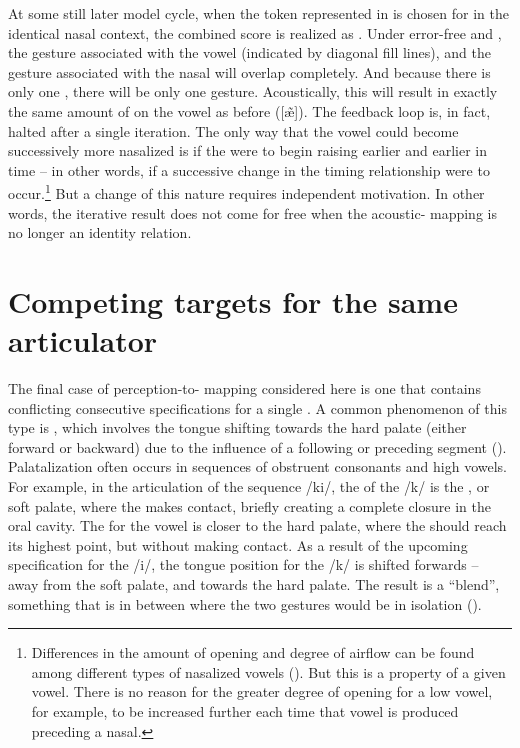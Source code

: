 At some still later model cycle, when the token represented in 
is chosen for  in the identical nasal context, the combined
 score is realized as .
Under error-free  and , the  gesture associated
with the vowel (indicated by diagonal fill lines), and the  gesture
associated with the nasal will overlap completely. And because there
is only one , there will be only one  gesture. Acoustically,
this will result in exactly the same amount of  on the vowel
as before ({[æ̃]}). The feedback loop is, in fact, halted
after a single iteration. The only way that the vowel could become
successively more nasalized is if the  were to begin raising
earlier and earlier in time – in other words, if a successive change
in the timing relationship were to occur.\footnote{Differences in the amount of  opening and degree of  airflow
can be found among different types of nasalized vowels (\citealt{bell1993understanding,hajek2000vowel}).
But this is a property of a given vowel. There is no reason for the
greater degree of  opening for a low vowel, for example, to be
increased further each time that vowel is produced preceding a nasal.} But a change of this nature requires independent motivation. In
other words, the iterative result does not come for free when the
acoustic- mapping is no longer an identity relation. 

\section{\label{sec:Competing-targets}Competing targets for the same articulator}

The final case of perception-to- mapping considered here
is one that contains conflicting consecutive specifications for a
single . A common phenomenon of this type is ,
which involves the tongue shifting towards the hard palate (either
forward or backward) due to the influence of a following or preceding
segment (\citealt{Guion1998,Keating1993}). Palatalization often occurs
in sequences of obstruent consonants and high vowels. For example,
in the articulation of the sequence {/ki/}, the 
 of the {/k/} is the , or soft palate, where the
 makes contact, briefly creating a complete closure in
the oral cavity. The   for the vowel is closer to
the hard palate, where the  should reach its highest point,
but without making contact. As a result of the upcoming 
specification for the {/i/}, the tongue position for the
{/k/} is shifted forwards – away from the soft palate, and
towards the hard palate. The result is a “blend”, something
that is in between where the two gestures would be in isolation (\citealt{Browman1986,Zsiga2000}). 

